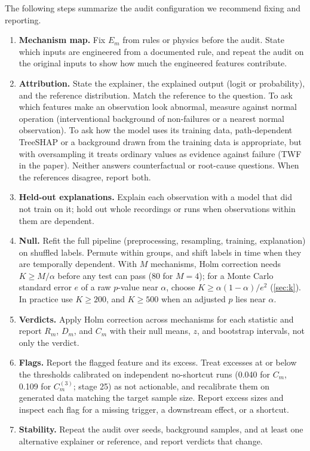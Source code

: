 \documentclass[10pt]{article}
\begin{document}
The following steps summarize the audit configuration we recommend fixing and reporting.
\begin{enumerate}
\item \textbf{Mechanism map.} Fix $E_m$ from rules or physics before the audit. State which inputs are engineered from a documented rule, and repeat the audit on the original inputs to show how much the engineered features contribute.
\item \textbf{Attribution.} State the explainer, the explained output (logit or probability), and the reference distribution. Match the reference to the question. To ask which features make an observation look abnormal, measure against normal operation (interventional background of non-failures or a nearest normal observation). To ask how the model uses its training data, path-dependent TreeSHAP or a background drawn from the training data is appropriate, but with oversampling it treats ordinary values as evidence against failure (TWF in the paper). Neither answers counterfactual or root-cause questions. When the references disagree, report both.
\item \textbf{Held-out explanations.} Explain each observation with a model that did not train on it; hold out whole recordings or runs when observations within them are dependent.
\item \textbf{Null.} Refit the full pipeline (preprocessing, resampling, training, explanation) on shuffled labels. Permute within groups, and shift labels in time when they are temporally dependent. With $M$ mechanisms, Holm correction needs $K\geq M/\alpha$ before any test can pass (80 for $M=4$); for a Monte Carlo standard error $e$ of a raw $p$-value near $\alpha$, choose $K\geq\alpha(1-\alpha)/e^2$ (\cref{sec:k}). In practice use $K\geq200$, and $K\geq500$ when an adjusted $p$ lies near $\alpha$.
\item \textbf{Verdicts.} Apply Holm correction across mechanisms for each statistic and report $R_m$, $D_m$, and $C_m$ with their null means, $z$, and bootstrap intervals, not only the verdict.
\item \textbf{Flags.} Report the flagged feature and its excess. Treat excesses at or below the thresholds calibrated on independent no-shortcut runs (0.040 for $C_m$, 0.109 for $C^{(3)}_m$; stage 25) as not actionable, and recalibrate them on generated data matching the target sample size. Report excess sizes and inspect each flag for a missing trigger, a downstream effect, or a shortcut.
\item \textbf{Stability.} Repeat the audit over seeds, background samples, and at least one alternative explainer or reference, and report verdicts that change.
\end{enumerate}
\end{document}
